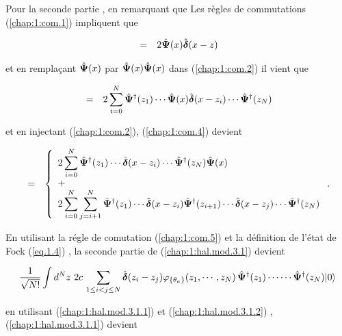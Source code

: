 Pour la seconde partie  , en remarquant que Les règles de commutations (\ref{chap:1:com.1}) impliquent que 

\begin{eqnarray}
	[ \operator{\Psi}(x) \operator{\Psi}(x),  \operator{\Psi}^\dag(z) ] & =& 2\operator{\Psi}(x)\operator{\delta}(x - z)\label{chap:1:com.3}  		
\end{eqnarray}

et en remplaçant $\hat{\bm{\Psi}}(x)$ par $\hat{\bm{\Psi}}(x)\hat{\bm{\Psi}}(x)$ dans  (\ref{chap:1:com.2}) il vient que  

\begin{eqnarray}
	[ \operator{\Psi}(x)\operator{\Psi}(x),  \operator{\Psi}^\dag(z_1)\cdots \operator{\Psi}^\dag(z_N)  ]  &=&  2\sum_{i = 0}^{N} \operator{\Psi}^\dag(z_1) \cdots  \operator{\Psi}(x)\operator{\delta}(x-z_i) \cdots \operator{\Psi}^\dag(z_N) \label{chap:1:com.4}		
\end{eqnarray}

et en injectant (\ref{chap:1:com.2}),  (\ref{chap:1:com.4}) devient 

\begin{eqnarray}
	[ \operator{\Psi}(x)\operator{\Psi}(x),  \operator{\Psi}^\dag(z_1)\cdots \operator{\Psi}^\dag(z_N)  ]  &=& \left\{ \begin{array}{l} \displaystyle 2\sum_{i = 0}^{N} \operator{\Psi}^\dag(z_1) \cdots  \operator{\delta}(x-z_i) \cdots \operator{\Psi}^\dag(z_N) \operator{\Psi}(x) \\ + \\ \displaystyle 2\sum_{i = 0}^{N}\sum_{j = i+1}^{N} \operator{\Psi}^\dag(z_1) \cdots\operator{\delta}(x-z_i)\operator{\Psi}^\dag(z_{i+1})\cdots  \operator{\delta}(x-z_j) \cdots \operator{\Psi}^\dag(z_N) \end{array}\right. \label{chap:1:com.5}	.	
\end{eqnarray}

En utilisant la régle de comutation (\ref{chap:1:com.5}) et la définition de l'état de Fock (\ref{eq.1.4}) , la seconde partie de (\ref{chap:1:hal.mod.3.1}) devient

\begin{eqnarray}
	 \frac{1}{ \sqrt{N!}} \int d^N z \,  \,2c \,\sum_{1\leq i<j\leq N} \hat{\bm{\delta}}(z_i - z_j) \varphi_{\{\theta_a\}}(z_1, \cdots ,  z_N) \, \hat{\bm{\Psi}}^\dag(z_1) \cdots  \cdots\hat{\bm{\Psi}}^\dag(z_N) \vert 0 \rangle \label{chap:1:hal.mod.3.1.2}	
\end{eqnarray} 

en utilisant (\ref{chap:1:hal.mod.3.1.1}) et (\ref{chap:1:hal.mod.3.1.2}) , (\ref{chap:1:hal.mod.3.1.1}) devient 

